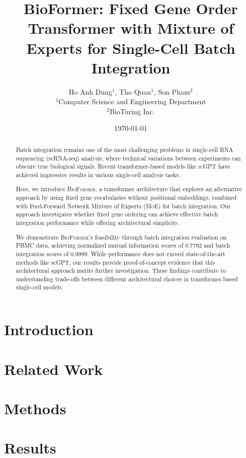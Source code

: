 \documentclass[11pt]{article}
\title{\textbf{BioFormer: Fixed Gene Order Transformer with Mixture of Experts for Single-Cell Batch Integration}}
\author{
Ho Anh Dung$^{1}$, Tho Quan$^{1}$, Son Pham$^{2}$ \\
\small $^1$Computer Science and Engineering Department \\
\small $^2$BioTuring Inc.
}
\date{\today}
\newcommand{\bioformer}{\textsc{BioFormer}}
\newcommand{\scgpt}{\textsc{scGPT}}
\newcommand{\moe}{\textsc{MoE}}
\begin{document}
\maketitle

\begin{abstract}
Batch integration remains one of the most challenging problems in single-cell RNA sequencing (scRNA-seq) analysis, where technical variations between experiments can obscure true biological signals. Recent transformer-based models like \scgpt{} have achieved impressive results in various single-cell analysis tasks.

Here, we introduce \bioformer{}, a transformer architecture that explores an alternative approach by using fixed gene vocabularies without positional embeddings, combined with Feed-Forward Network Mixture of Experts (\moe{}) for batch integration. Our approach investigates whether fixed gene ordering can achieve effective batch integration performance while offering architectural simplicity.

We demonstrate \bioformer{}'s feasibility through batch integration evaluation on PBMC data, achieving normalized mutual information scores of 0.7792 and batch integration scores of 0.9999. While performance does not exceed state-of-the-art methods like scGPT, our results provide proof-of-concept evidence that this architectural approach merits further investigation. These findings contribute to understanding trade-offs between different architectural choices in transformer-based single-cell models.
\end{abstract}

\section{Introduction}


\section{Related Work}


\section{Methods}


\section{Results}

\end{document}
